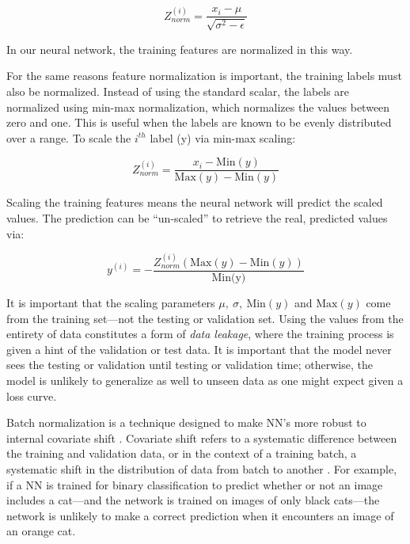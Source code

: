 \begin{equation}
    \label{z-score}
    Z_{norm}^{(i)} = \dfrac{x_i-\mu}{\sqrt{\sigma^2-\epsilon}}
\end{equation}

\noindent In our neural network, the training features are normalized in this way. 

For the same reasons feature normalization is important, the training labels must also be normalized. Instead of using the standard scalar, the labels are normalized using min-max normalization, which normalizes the values between zero and one. This is useful when the labels are known to be evenly distributed over a range. To scale the $ i^{th} $ label (y) via min-max scaling:

\begin{equation}
    Z_{norm}^{(i)} = \dfrac{x_i - \text{Min}(y)}{\text{Max}(y) - \text{Min}(y)}
\end{equation}

Scaling the training features means the neural network will predict the scaled values. The prediction can be ``un-scaled'' to retrieve the real, predicted values via:

\begin{equation}
    y^{(i)} = - \dfrac{Z_{norm}^{(i)}\left(\text{Max}(y) - \text{Min}(y)\right)}{\text{Min(y)}}
\end{equation}

\noindent It is important that the scaling parameters $ \mu,~\sigma,~\text{Min}(y)$ and $\text{Max}(y) $ come from the training set---not the testing or validation set. Using the values from the entirety of data constitutes a form of \textit{data leakage}, where the training process is given a hint of the validation or test data. It is important that the model never sees the testing or validation until testing or validation time; otherwise, the model is unlikely to generalize as well to unseen data as one might expect given a loss curve.

Batch normalization is a technique designed to make NN's more robust to internal covariate shift \cite{batch-norm-orig}. Covariate shift refers to a systematic difference between the training and validation data, or in the context of a training batch, a systematic shift in the distribution of data from batch to another \cite{batch-norm-conference}. For example, if a NN is trained for binary classification to predict whether or not an image includes a cat---and the network is trained on images of only black cats---the network is unlikely to make a correct prediction when it encounters an image of an orange cat.


